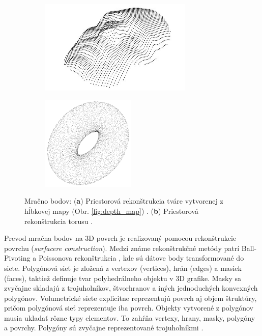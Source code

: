 \begin{figure}[!h]
	\centering
	\begin{subfigure}[b]{0.45\textwidth}
		\centering
		\includegraphics[height=4.5cm]{figures/point_cloud.jpeg}
		\caption{}
		\label{fig:point_cloud:a}
	\end{subfigure}
	\begin{subfigure}[b]{0.45\textwidth}
		\centering
		\includegraphics[height=4.5cm]{figures/point_cloud_b.png}
		\caption{}
		\label{fig:point_cloud:b}
	\end{subfigure}
	\caption{Mračno bodov: (\textbf{a}) Priestorová rekonštrukcia tváre vytvorenej z hĺbkovej mapy (Obr. \ref{fig:depth_map}) \cite{fabry2010surface}. (\textbf{b}) Priestorová rekonštrukcia torusu \cite{point_intel}. }
	\label{fig:point_cloud}
\end{figure}


Prevod mračna bodov na 3D povrch je realizovaný pomocou rekonštrukcie povrchu (\textit{surfacere construction}). Medzi známe rekonštrukčné metódy patrí Ball-Pivoting \cite{bernardini1999ball} a  Poissonova rekonštrukcia \cite{kazhdan2006poisson}, kde sú dátove body transformované do siete. Polygónová sieť je zložená z vertexov (vertices), hrán (edges) a masiek (faces), taktiež definuje tvar polyhedrálneho objektu v 3D grafike. Masky sa zvyčajne skladajú z trojuholníkov, štvorhranov a iných jednoduchých konvexných polygónov. Volumetrické siete explicitne reprezentujú povrch aj objem štruktúry, pričom polygónová sieť reprezentuje iba povrch. Objekty vytvorené z polygónov musia ukladať rôzne typy elementov. To zahŕňa vertexy, hrany, masky, polygóny a povrchy. Polygóny sú zvyčajne reprezentované trojuholníkmi \cite{smith2006vertex}. 

